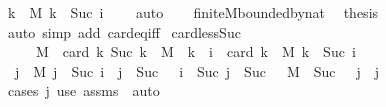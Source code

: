 \begin{isabellebody}
\ {\isachardoublequoteopen}{\isacharbraceleft}{\kern0pt}k\ {\isasymin}\ M{\isachardot}{\kern0pt}\ k\ {\isacharless}{\kern0pt}\ Suc\ i{\isacharbraceright}{\kern0pt}\ {\isasymnoteq}\ {\isacharbraceleft}{\kern0pt}{\isacharbraceright}{\kern0pt}{\isachardoublequoteclose}\ \isamarkupfalse%
\ auto\isanewline
\ \ \isamarkupfalse%
\ finite{\isacharunderscore}{\kern0pt}M{\isacharunderscore}{\kern0pt}bounded{\isacharunderscore}{\kern0pt}by{\isacharunderscore}{\kern0pt}nat\ \isamarkupfalse%
\ {\isacharquery}{\kern0pt}thesis\ \isamarkupfalse%
\ {\isacharparenleft}{\kern0pt}auto\ simp\ add{\isacharcolon}{\kern0pt}\ card{\isacharunderscore}{\kern0pt}eq{\isacharunderscore}{\kern0pt}{}{\isacharunderscore}{\kern0pt}iff{\isacharparenright}{\kern0pt}\isanewline
{}\isamarkupfalse%
%
\endisatagproof
{\isafoldproof}%
%
\isadelimproof
\isanewline
%
\endisadelimproof
\isanewline
{}\isamarkupfalse%
\ card{\isacharunderscore}{\kern0pt}less{\isacharunderscore}{\kern0pt}Suc{}{\isacharcolon}{\kern0pt}\ \isanewline
\ \ \ {\isachardoublequoteopen}{}\ {\isasymnotin}\ M{\isachardoublequoteclose}\ \ {\isachardoublequoteopen}card\ {\isacharbraceleft}{\kern0pt}k{\isachardot}{\kern0pt}\ Suc\ k\ {\isasymin}\ M\ {\isasymand}\ k\ {\isacharless}{\kern0pt}\ i{\isacharbraceright}{\kern0pt}\ {\isacharequal}{\kern0pt}\ card\ {\isacharbraceleft}{\kern0pt}k\ {\isasymin}\ M{\isachardot}{\kern0pt}\ k\ {\isacharless}{\kern0pt}\ Suc\ i{\isacharbraceright}{\kern0pt}{\isachardoublequoteclose}\isanewline
%
\isadelimproof
%
\endisadelimproof
%
\isatagproof
{}\isamarkupfalse%
\ {\isacharminus}{\kern0pt}\isanewline
\ \ \isamarkupfalse%
\ {\isacharasterisk}{\kern0pt}{\isacharcolon}{\kern0pt}\ {\isachardoublequoteopen}{\isasymlbrakk}j\ {\isasymin}\ M{\isacharsemicolon}{\kern0pt}\ j\ {\isacharless}{\kern0pt}\ Suc\ i{\isasymrbrakk}\ {\isasymLongrightarrow}\ j\ {\isacharminus}{\kern0pt}\ Suc\ {}\ {\isacharless}{\kern0pt}\ i\ {\isasymand}\ Suc\ {\isacharparenleft}{\kern0pt}j\ {\isacharminus}{\kern0pt}\ Suc\ {}{\isacharparenright}{\kern0pt}\ {\isasymin}\ M\ {\isasymand}\ Suc\ {}\ {\isasymle}\ j{\isachardoublequoteclose}\ \ j\isanewline
\ \ \ \ \isamarkupfalse%
\ {\isacharparenleft}{\kern0pt}cases\ j{\isacharparenright}{\kern0pt}\ {\isacharparenleft}{\kern0pt}use\ assms\ \ auto{\isacharparenright}{\kern0pt}\isanewline
\ \ \isamarkupfalse%

\end{isabellebody}
